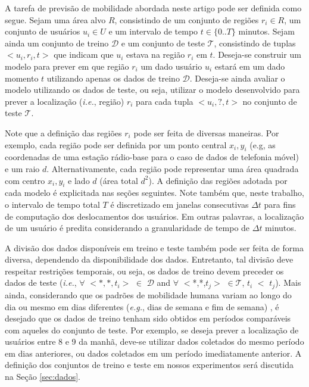 \documentclass[10pt, a4paper, onecolumn, conference, compsocconf]{IEEEtran}
\begin{document}
A tarefa de previsão de mobilidade abordada neste artigo pode ser definida como segue. Sejam uma área  alvo $R$, consistindo de um conjunto de regiões $r_i \in R$, um conjunto de usuários $u_i \in U$ e um intervalo de tempo $t \in \{0..T\}$ minutos. Sejam ainda um conjunto de treino $\mathcal{D}$ e um conjunto de teste $\mathcal{T}$, consistindo de tuplas $<u_i, r_i, t>$ que indicam que $u_i$ estava na região $r_i$ em $t$. Deseja-se construir um modelo para prever em que região $r_i$ um dado usuário $u_i$ estará em um dado momento $t$ utilizando apenas os dados de treino $\mathcal{D}$. Deseja-se ainda avaliar o modelo utilizando os dados de teste, ou seja,  utilizar o modelo desenvolvido para prever a localização (\textit{i.e.}, região) $r_i$ para cada tupla $<u_i, ? , t>$ no conjunto de teste $\mathcal{T}$.  

Note que a definição das regiões $r_i$ pode ser feita de diversas maneiras. Por exemplo, cada região pode ser definida por um ponto central $x_i,y_i$ (e.g, as coordenadas de uma estação rádio-base para o caso de dados de telefonia móvel)  e um raio $d$. Alternativamente, cada região pode  representar uma área quadrada com centro $x_i,y_i$ e lado $d$ (área total $d^2$).  A definição das regiões adotada por cada modelo é explicitada nas seções seguintes.  Note também que, neste trabalho,  o intervalo de tempo total $T$ é discretizado em janelas consecutivas $\Delta t$ para fins de computação dos deslocamentos dos usuários. Em outras palavras,  a localização de um usuário é predita considerando a granularidade de tempo de $\Delta t$ minutos.


A divisão dos dados disponíveis em treino e teste também pode ser feita de forma diversa, dependendo da disponibilidade dos dados. Entretanto, tal divisão deve  respeitar restrições temporais, ou seja, os dados de treino devem preceder os dados de teste (\textit{i.e.}, $\forall$ $<$$*,*,t_i$$>$ $\in$ $\mathcal{D}$  and  $\forall$ $<$*,*,$t_j$$>$ $\in \mathcal{T}$, $t_i$ $<$ $t_j$). Mais ainda, considerando que os padrões de mobilidade humana variam ao longo do dia ou mesmo em dias diferentes (\textit{e.g.}, dias de semana e fim de semana) \cite{Xavier2012},  é desejado que os dados de treino tenham sido obtidos em períodos comparáveis com aqueles do conjunto de teste. Por exemplo, se deseja prever a localização de usuários entre 8 e 9 da manhã, deve-se utilizar dados coletados do mesmo período em dias anteriores, ou dados coletados em um período imediatamente anterior. A definição dos conjuntos de treino e teste em nossos experimentos será discutida na Seção \ref{sec:dados}.
\end{document}
